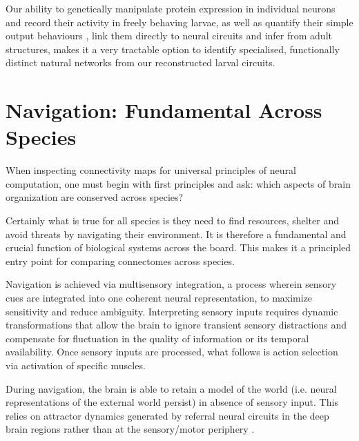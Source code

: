 Our ability to genetically manipulate protein expression in individual neurons and record their activity in freely behaving larvae, as well as quantify their simple output behaviours \citep{vogelstein2014discovery}, link them directly to neural circuits and infer from adult structures, makes it a very tractable option to identify specialised, functionally distinct natural networks from our reconstructed larval circuits.


\section{Navigation: Fundamental Across Species} 

    When inspecting connectivity maps for universal principles of neural computation, one must begin with first principles and ask: which aspects of brain organization are conserved across species?
    
    Certainly what is true for all species is they need to find resources, shelter and avoid threats by navigating their environment. It is therefore a fundamental and crucial function of biological systems across the board. This makes it a principled entry point for comparing connectomes across species. 


    Navigation is achieved via multisensory integration, a process wherein sensory cues are integrated into one coherent neural representation, to maximize sensitivity and reduce ambiguity. Interpreting sensory inputs requires dynamic transformations that allow the brain to ignore transient sensory distractions and compensate for fluctuation in the quality of information or its temporal availability. Once sensory inputs are processed, what follows is action selection via activation of specific muscles. 
    
    During navigation, the brain is able to retain a model of the world (i.e. neural representations of the external world persist) in absence of sensory input. This relies on attractor dynamics generated by referral neural circuits in the deep brain regions rather than at the sensory/motor periphery \citep{khona2022attractor}. 
    
